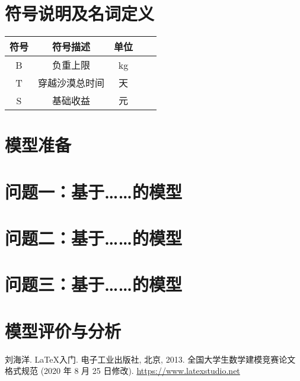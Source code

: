 \documentclass[withoutpreface,bwprint]{cumcmthesis} %
\begin{document}
\section{符号说明及名词定义}
\begin{table}[!htbp]

    \centering
    \begin{tabular}{ccccc}
        \toprule[1.5pt]
        符号 & 符号描述 & 单位 \\
        \midrule[1pt]
        B & 负重上限 & kg \\
        T & 穿越沙漠总时间 & 天 \\
        S & 基础收益 & 元 \\
        \bottomrule[1.5pt]
    \end{tabular}
\end{table}

\section{模型准备}


\section{问题一：基于……的模型}

\section{问题二：基于……的模型}

\section{问题三：基于……的模型}


\section{模型评价与分析}

\newpage
\begin{thebibliography}{9}%
    刘海洋.
    \newblock \LaTeX {}入门\allowbreak[J].
    \newblock 电子工业出版社, 北京, 2013.
    全国大学生数学建模竞赛论文格式规范 (2020 年 8 月 25 日修改).
     \url{https://www.latexstudio.net}
\end{thebibliography}
\end{document}

